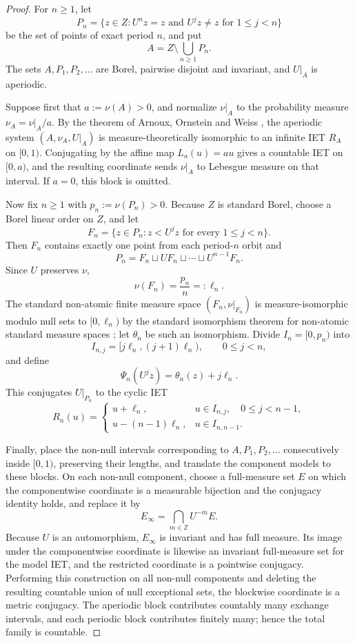 \documentclass[11pt]{amsart}
\theoremstyle{plain}
\theoremstyle{definition}
\theoremstyle{remark}
\begin{document}
\begin{proof}
For \(n\geq1\), let
\[
P_n=\{z\in Z:U^n z=z\text{ and }U^jz\neq z\text{ for }1\leq j<n\}
\]
be the set of points of exact period \(n\), and put
\[
        A=Z\setminus\bigcup_{n\geq1}P_n.
\]
The sets \(A,P_1,P_2,\ldots\) are Borel, pairwise disjoint and invariant, and \(U|_A\)
is aperiodic.

Suppose first that \(a:=\nu(A)>0\), and normalize \(\nu|_A\) to the probability measure
\(\nu_A=\nu|_A/a\). By the theorem of Arnoux, Ornstein and Weiss
\cite{ArnouxOrnsteinWeiss1985}, the aperiodic system \((A,\nu_A,U|_A)\) is
measure-theoretically isomorphic to an infinite IET \(R_A\) on \([0,1)\). Conjugating by
the affine map \(L_a(u)=au\) gives a countable IET on \([0,a)\), and the resulting
coordinate sends \(\nu|_A\) to Lebesgue measure on that interval. If \(a=0\), this block is
omitted.

Now fix \(n\geq1\) with \(p_n:=\nu(P_n)>0\). Because \(Z\) is standard Borel, choose a
Borel linear order on \(Z\), and let
\[
F_n=\{z\in P_n:z<U^jz\text{ for every }1\leq j<n\}.
\]
Then \(F_n\) contains exactly one point from each period-\(n\) orbit and
\[
        P_n=F_n\sqcup UF_n\sqcup\cdots\sqcup U^{n-1}F_n.
\]
Since \(U\) preserves \(\nu\),
\[
        \nu(F_n)=\frac{p_n}{n}=: \ell_n.
\]
The standard non-atomic finite measure space \((F_n,\nu|_{F_n})\) is measure-isomorphic
modulo null sets to \([0,\ell_n)\) by the standard isomorphism theorem for non-atomic
standard measure spaces \cite{CornfeldFominSinai1982}; let \(\theta_n\) be such an
isomorphism. Divide \(I_n=[0,p_n)\) into
\[
        I_{n,j}=[j\ell_n,(j+1)\ell_n),\qquad 0\leq j<n,
\]
and define
\[
        \Psi_n(U^jz)=\theta_n(z)+j\ell_n.
\]
This conjugates \(U|_{P_n}\) to the cyclic IET
\[
R_n(u)=
\begin{cases}
        u+\ell_n,&u\in I_{n,j},\quad 0\leq j<n-1,\\
        u-(n-1)\ell_n,&u\in I_{n,n-1}.
\end{cases}
\]

Finally, place the non-null intervals corresponding to \(A,P_1,P_2,\ldots\) consecutively
inside \([0,1)\), preserving their lengths, and translate the component models to these
blocks. On each non-null component, choose a full-measure set \(E\) on which the
componentwise coordinate is a measurable bijection and the conjugacy identity holds, and
replace it by
\[
        E_\infty=\bigcap_{m\in\mathbb Z}U^{-m}E.
\]
Because \(U\) is an automorphism, \(E_\infty\) is invariant and has full measure. Its image
under the componentwise coordinate is likewise an invariant full-measure set for the model
IET, and the restricted coordinate is a pointwise conjugacy. Performing this construction on
all non-null components and deleting the resulting countable union of null exceptional sets,
the blockwise coordinate is a metric conjugacy. The aperiodic block contributes countably
many exchange intervals, and each periodic block contributes finitely many; hence the total
family is countable.
\end{proof}
\end{document}
